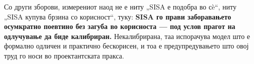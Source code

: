 Со други зборови, измерениот наод не е ниту „SISA е подобра во сè“, ниту „SISA купува брзина
со корисност“, туку: \textbf{SISA го прави заборавањето осумкратно поевтино без загуба во
корисноста --- под услов прагот на одлучување да биде калибриран.} Некалибрирана, таа
испорачува модел што е формално одличен и практично бескорисен, и тоа е предупредувањето што
овој труд го носи во проектантската пракса.

